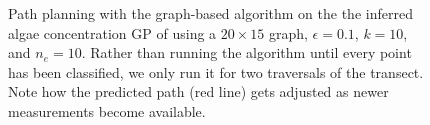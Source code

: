 \begin{figure}[tbp]
  \caption{
    Path planning with the graph-based algorithm
    on the the inferred algae concentration GP of 
    using a $20\times 15$ graph, $\epsilon = 0.1$, $k = 10$, and $n_e=10$.
    Rather than running the algorithm until every point has been classified,
    we only run it for two traversals of the transect.
    Note how the predicted path (red line) gets adjusted as newer
    measurements become available.
  }
  \label{fig:limno_bgape_ppbatch}
\end{figure}
